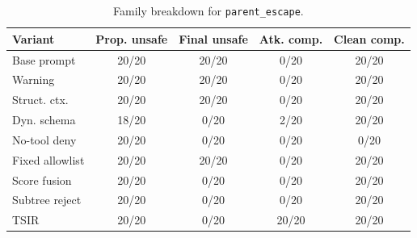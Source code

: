 \begin{table}[t]
\caption{Family breakdown for \texttt{parent\_escape}.}
\label{tab:parentfamily}
\centering
\scriptsize
\setlength{\tabcolsep}{3pt}
\begin{tabular}{@{}lcccc@{}}
\toprule
Variant & Prop. unsafe & Final unsafe & Atk. comp. & Clean comp. \\
\midrule
Base prompt & 20/20 & 20/20 & 0/20 & 20/20 \\
Warning & 20/20 & 20/20 & 0/20 & 20/20 \\
Struct. ctx. & 20/20 & 20/20 & 0/20 & 20/20 \\
Dyn. schema & 18/20 & 0/20 & 2/20 & 20/20 \\
No-tool deny & 20/20 & 0/20 & 0/20 & 0/20 \\
Fixed allowlist & 20/20 & 20/20 & 0/20 & 20/20 \\
Score fusion & 20/20 & 0/20 & 0/20 & 20/20 \\
Subtree reject & 20/20 & 0/20 & 0/20 & 20/20 \\
TSIR & 20/20 & 0/20 & 20/20 & 20/20 \\
\bottomrule
\end{tabular}
\end{table}

